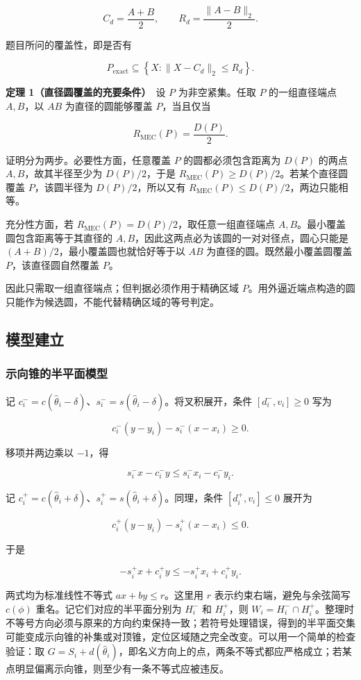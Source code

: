 \[
C_d=\frac{A+B}{2},\qquad R_d=\frac{\lVert A-B\rVert_2}{2}.
\]

题目所问的覆盖性，即是否有

\[
P_{\mathrm{exact}}\subseteq\left\{X:\lVert X-C_d\rVert_2\le R_d\right\}.
\]

\textbf{定理 1（直径圆覆盖的充要条件）}　设 $P$ 为非空紧集。任取 $P$ 的一组直径端点 $A,B$，以 $AB$ 为直径的圆能够覆盖 $P$，当且仅当

\[
R_{\mathrm{MEC}}(P)=\frac{D(P)}2.
\]

证明分为两步。必要性方面，任意覆盖 $P$ 的圆都必须包含距离为 $D(P)$ 的两点 $A,B$，故其半径至少为 $D(P)/2$，于是 $R_{\mathrm{MEC}}(P)\ge D(P)/2$。若某个直径圆覆盖 $P$，该圆半径为 $D(P)/2$，所以又有 $R_{\mathrm{MEC}}(P)\le D(P)/2$，两边只能相等。

充分性方面，若 $R_{\mathrm{MEC}}(P)=D(P)/2$，取任意一组直径端点 $A,B$。最小覆盖圆包含距离等于其直径的 $A,B$，因此这两点必为该圆的一对对径点，圆心只能是 $(A+B)/2$，最小覆盖圆也就恰好等于以 $AB$ 为直径的圆。既然最小覆盖圆覆盖 $P$，该直径圆自然覆盖 $P$。

因此只需取一组直径端点；但判据必须作用于精确区域 $P$。用外逼近端点构造的圆只能作为候选圆，不能代替精确区域的等号判定。

\subsection{模型建立}

\subsubsection{示向锥的半平面模型}

记 $c_i^-=c(\hat\theta_i-\delta)$、$s_i^-=s(\hat\theta_i-\delta)$。将叉积展开，条件 $[d_i^-,v_i]\ge0$ 写为

\[
c_i^-(y-y_i)-s_i^-(x-x_i)\ge0.
\]

移项并两边乘以 $-1$，得

\[
s_i^-x-c_i^-y\le s_i^-x_i-c_i^-y_i.
\]

记 $c_i^+=c(\hat\theta_i+\delta)$、$s_i^+=s(\hat\theta_i+\delta)$。同理，条件 $[d_i^+,v_i]\le0$ 展开为

\[
c_i^+(y-y_i)-s_i^+(x-x_i)\le0.
\]

于是

\[
-s_i^+x+c_i^+y\le -s_i^+x_i+c_i^+y_i.
\]

两式均为标准线性不等式 $ax+by\le r$。这里用 $r$ 表示约束右端，避免与余弦简写 $c(\phi)$ 重名。记它们对应的半平面分别为 $H_i^-$ 和 $H_i^+$，则 $W_i=H_i^-\cap H_i^+$。整理时不等号方向必须与原来的方向约束保持一致；若符号处理错误，得到的半平面交集可能变成示向锥的补集或对顶锥，定位区域随之完全改变。可以用一个简单的检查验证：取 $G=S_i+d(\hat\theta_i)$，即名义方向上的点，两条不等式都应严格成立；若某点明显偏离示向锥，则至少有一条不等式应被违反。


